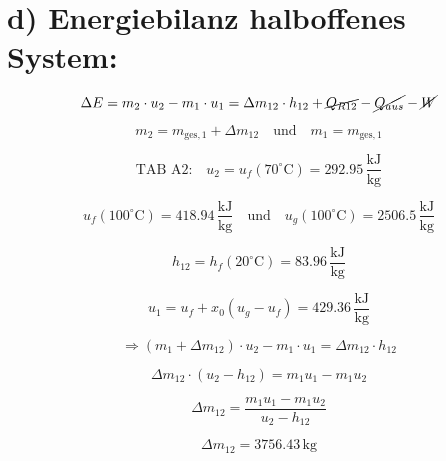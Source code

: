 \section*{d) Energiebilanz halboffenes System:}

\[
\Delta E = m_2 \cdot u_2 - m_1 \cdot u_1 = \Delta m_{12} \cdot h_{12} + \cancel{Q_{R12}} - \cancel{Q_{aus}} - \cancel{W}
\]

\[
m_2 = m_{\text{ges},1} + \Delta m_{12} \quad \text{und} \quad m_1 = m_{\text{ges},1}
\]

\[
\text{TAB A2:} \quad u_2 = u_f (70^\circ \text{C}) = 292.95 \, \frac{\text{kJ}}{\text{kg}}
\]

\[
u_f (100^\circ \text{C}) = 418.94 \, \frac{\text{kJ}}{\text{kg}} \quad \text{und} \quad u_g (100^\circ \text{C}) = 2506.5 \, \frac{\text{kJ}}{\text{kg}}
\]

\[
h_{12} = h_f (20^\circ \text{C}) = 83.96 \, \frac{\text{kJ}}{\text{kg}}
\]

\[
u_1 = u_f + x_0 (u_g - u_f) = 429.36 \, \frac{\text{kJ}}{\text{kg}}
\]

\[
\Rightarrow (m_1 + \Delta m_{12}) \cdot u_2 - m_1 \cdot u_1 = \Delta m_{12} \cdot h_{12}
\]

\[
\Delta m_{12} \cdot (u_2 - h_{12}) = m_1 u_1 - m_1 u_2
\]

\[
\Delta m_{12} = \frac{m_1 u_1 - m_1 u_2}{u_2 - h_{12}}
\]

\[
\Delta m_{12} = 3756.43 \, \text{kg}
\]